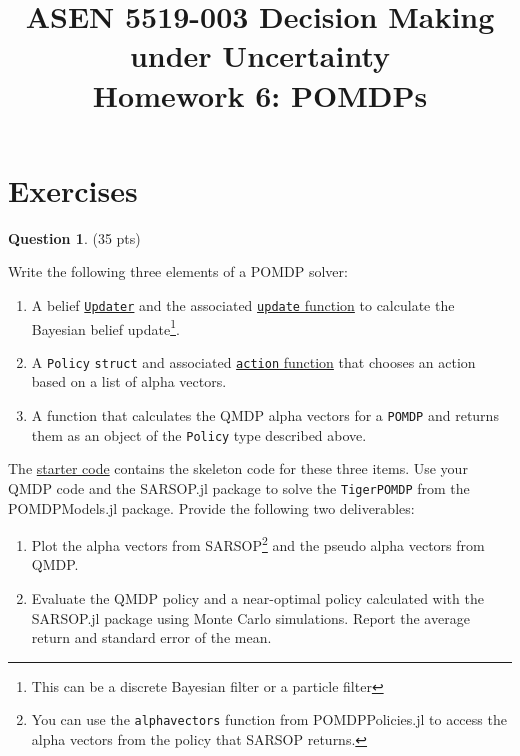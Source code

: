 \documentclass{article}
\title{ASEN 5519-003 Decision Making under Uncertainty\\
       Homework 6: POMDPs}
\theoremstyle{definition}
\newtheorem{question}[thm]{Question}
\begin{document}
\maketitle



\section{Exercises}

\begin{question} \label{q:tiger}
    (35 pts)

    Write the following three elements of a POMDP solver:
    \begin{enumerate}[noitemsep]
        \item A belief \href{https://juliapomdp.github.io/POMDPs.jl/stable/def_updater/}{\texttt{Updater}} and the associated \href{https://juliapomdp.github.io/POMDPs.jl/stable/api/#POMDPs.update}{\texttt{update} function} to calculate the Bayesian belief update\footnote{This can be a discrete Bayesian filter or a particle filter}.
        \item A \texttt{Policy} \texttt{struct} and associated \href{https://juliapomdp.github.io/POMDPs.jl/stable/api/#POMDPs.action}{\texttt{action} function} that chooses an action based on a list of alpha vectors.
        \item A function that calculates the QMDP alpha vectors for a \texttt{POMDP} and returns them as an object of the \texttt{Policy} type described above.
    \end{enumerate}
    The \href{https://github.com/zsunberg/CU-DMU-Materials/blob/master/hw/6-POMDPs/starter_code.jl}{starter code} contains the skeleton code for these three items. Use your QMDP code and the SARSOP.jl package to solve the \texttt{TigerPOMDP} from the POMDPModels.jl package. Provide the following two deliverables:
    \begin{enumerate}[label=\alph*)]
        \item Plot the alpha vectors from SARSOP\footnote{You can use the \texttt{alphavectors} function from POMDPPolicies.jl to access the alpha vectors from the policy that SARSOP returns.} and the pseudo alpha vectors from QMDP.
        \item Evaluate the QMDP policy and a near-optimal policy calculated with the SARSOP.jl package using Monte Carlo simulations. Report the average return and standard error of the mean.
    \end{enumerate}
\end{question}
\end{document}
